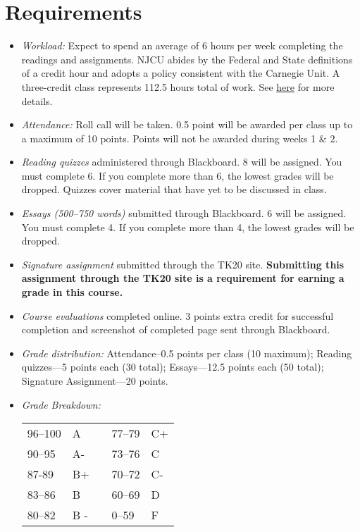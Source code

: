 \documentclass[article,oneside]{memoir}
\begin{document}
\section{Requirements}



\begin{itemize}
\item \textit{Workload:} Expect to spend an average of 6 hours per week completing the readings and assignments. NJCU abides by the Federal and State definitions of a credit hour and adopts a policy consistent with the Carnegie Unit. A three-credit class represents 112.5 hours total of work. See \href{http://scoconno.github.io/Teaching/Credit.pdf}{here} for more details.

\item \textit{Attendance:} Roll call will be taken. 0.5 point will be awarded per class up to a maximum of 10 points. Points will not be awarded during weeks 1 \& 2. 

\item \textit{Reading quizzes} administered through Blackboard. 8  will be assigned. You must complete 6. If you complete more than 6, the lowest grades will be dropped. Quizzes cover material that have yet to be discussed in class.


\item \textit{Essays (500--750 words)} submitted through Blackboard.  6 will be assigned. You must complete 4. If you complete more than 4, the lowest grades will be dropped. 

\item \textit{Signature assignment} submitted through the TK20 site. \textbf{Submitting this assignment through the TK20 site is a requirement for earning a grade in this course.}

\item \textit{Course evaluations} completed online. 3 points extra credit for successful completion and screenshot of completed page sent through Blackboard. 
  
\item \textit{Grade distribution:} Attendance--0.5 points per class (10 maximum); Reading quizzes---5 points each (30 total);  Essays---12.5 points each (50 total); Signature Assignment---20 points.


\item \textit{Grade Breakdown:}

 \begin{tabular}{ | l | l | p{2cm} | l | l | }
    \hline 
96--100 & A  & &  77--79 &  C+ \\  
90--95 & A- & &  73--76 & C \\
87-89 & B+ &  &  70--72 & C- \\ 
83--86 & B  & &  60--69 & D\\
80--82 & B - & & 0--59 & F\\ \hline
    \end{tabular}


\end{itemize}
\end{document}
